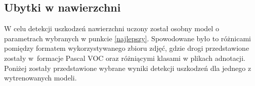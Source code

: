 \subsection{Ubytki w nawierzchni}
\hspace{0.5cm}
W celu detekcji uszkodzeń nawierzchni uczony został osobny model o parametrach wybranych w punkcie \ref{najlepszy}. Spowodowane było to różnicami pomiędzy formatem wykorzystywanego zbioru zdjęć, gdzie drogi przedstawione zostały w~formacje Pascal VOC oraz różniącymi klasami w plikach adnotacji. Poniżej zostały przedstawione wybrane wyniki detekcji uszkodzeń dla jednego z wytrenowanych modeli.

\begin{figure}[H]
\centering
{}
\hfill
{}

\end{figure}

